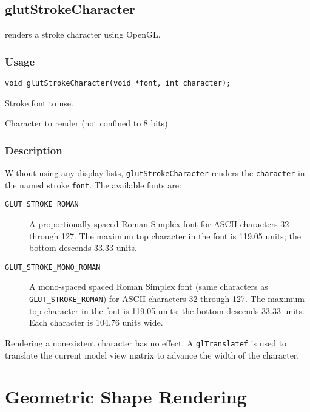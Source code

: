 \subsection{glutStrokeCharacter}

 renders a stroke character using OpenGL.

\subsubsection*{Usage}
\begin{verbatim}
void glutStrokeCharacter(void *font, int character);
\end{verbatim}
\begin{description}
\itemsep 0in
\item[\tt font]
Stroke font to use.
\item[\tt character]
Character to render (not confined to 8 bits).
\end{description}

\subsubsection*{Description}

Without using any display lists, {\tt glutStrokeCharacter} renders the {\tt character}
in the named stroke {\tt font}.  The available fonts are:
\begin{description}
\item[{\tt GLUT\_STROKE\_ROMAN}]
A proportionally spaced Roman Simplex font
for ASCII characters 32 through 127.  The maximum top character in the font
is 119.05 units; the bottom descends 33.33 units.

\item[{\tt GLUT\_STROKE\_MONO\_ROMAN}]
A mono-spaced spaced Roman Simplex font (same characters as {\tt GLUT\_STROKE\_ROMAN})
for ASCII characters 32 through 127.  The maximum top character in the font
is 119.05 units; the bottom descends 33.33 units.  Each character is 104.76
units wide.
\end{description}

Rendering a nonexistent character has no effect.  A {\tt glTranslatef} is used
to translate the current model view matrix to advance the width of the
character.

\section{Geometric Shape Rendering}

